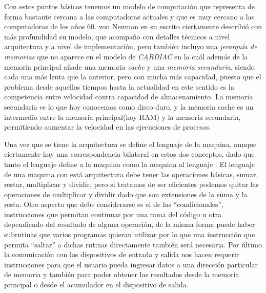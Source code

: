 \documentclass[letterpaper,12pt,oneside]{book}
\begin{document}
		Con estos puntos básicos tenemos un modelo de computación que representa de forma bastante cercana a las computadoras actuales y que es muy cercano
		a las computadoras de los años 60. von Neuman en su escrito ciertamente describió con más profundidad su modelo, que acompaño con detalles técnicos
		a nivel arquitectura y a nivel de implementación, pero también incluyo una 
		\textit{jerarquía de memorias} que no aparece en el modelo de \textit{CARDIAC} en la cuál además de la memoria principal añade una memoria 
		\textit{cache} y una \textit{memoria secundaria},
		siendo cada una más lenta que la anterior, pero con mucha más capacidad, puesto que el problema desde aquellos tiempos hasta la actualidad
		en este sentido es la competencia entre velocidad contra capacidad de almacenamiento. La memoria secundaria es lo que hoy conocemos como disco 
		duro, y la memoria cache es un intermedio entre la memoria principal(hoy RAM) y la memoria secundaria, permitiendo aumentar la velocidad en las 
		ejecuciones	de procesos\cite{von_neumann_papers_1987}.
		
		Una vez que se tiene la arquitectura se define el lenguaje de la maquina, aunque ciertamente hay una correspondencia bilateral en estos
		dos conceptos, dado que tanto el lenguaje define a la maquina como la maquina al lenguaje \cite{tanenbaum_structured_2013}. El
		lenguaje de una maquina con está arquitectura debe tener las operaciones básicas, sumar, restar, multiplicar y dividir, pero
		si tratamos de ser eficientes podemos quitar las operaciones de multiplicar y dividir dado que son extensiones de la suma y la resta. Otro
		aspecto que debe considerarse es el de las ``condicionales'', instrucciones que permitan continuar por una rama del código u otra
		dependiendo del resultado de alguna operación, de la misma forma puede haber subrutinas que varios programas quieran utilizar por lo
		que una instrucción que permita ``saltar'' a dichas rutinas directamente también será necesaria. Por último la comunicación con los dispositivos
		de entrada y salida nos hacen requerir instrucciones para que el usuario pueda ingresar datos a una dirección particular de memoria y también para
		poder obtener los resultados desde la memoria principal o desde el acumulador en el dispositivo de salida\cite{von_neumann_papers_1987}.
		
\end{document}
